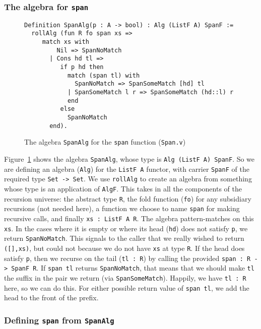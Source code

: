 \documentclass[a4paper,USenglish]{lipics-v2021}
\begin{document}
\subsubsection{The algebra for \texttt{span}}


\begin{figure}
\begin{verbatim}
Definition SpanAlg(p : A -> bool) : Alg (ListF A) SpanF :=
  rollAlg (fun R fo span xs => 
     match xs with
         Nil => SpanNoMatch 
       | Cons hd tl =>
          if p hd then
            match (span tl) with
              SpanNoMatch => SpanSomeMatch [hd] tl
            | SpanSomeMatch l r => SpanSomeMatch (hd::l) r
            end
          else
            SpanNoMatch 
       end).
\end{verbatim}
\caption{The algebra \texttt{SpanAlg} for the \texttt{span} function (\texttt{Span.v})}
\label{fig:spanalg}
\end{figure}

Figure~\ref{fig:spanalg} shows the algebra
\verb|SpanAlg|, whose type is \verb|Alg (ListF A) SpanF|.  So we are defining
an algebra (\verb|Alg|) for the \verb|ListF A| functor, with carrier
\verb|SpanF| of the required type \verb|Set -> Set|.  We use
\verb|rollAlg| to create an algebra from something whose type is an
application of \verb|AlgF|.  This takes in all the components of the
recursion universe: the abstract type \verb|R|, the fold function
(\verb|fo|) for any subsidiary recursions (not needed here), a
function we choose to name \verb|span| for making recursive calls, and
finally \verb|xs : ListF A R|.  The algebra pattern-matches on this
\verb|xs|.  In the cases where it is empty or where its head
(\verb|hd|) does not satisfy \verb|p|, we return \verb|SpanNoMatch|.
This signals to the caller that we really wished to return
\verb|([],xs)|, but could not because we do not have \verb|xs| at type
\verb|R|.  If the head does satisfy \verb|p|, then we recurse on the
tail (\verb|tl : R|) by calling the provided
\verb|span : R -> SpanF R|.  If \verb|span tl| returns
\verb|SpanNoMatch|, that means that we should make \verb|tl| the
suffix in the pair we return (via \verb|SpanSomeMatch|).  Happily, we
have \verb|tl : R| here, so we can do this.  For either possible return
value of \verb|span tl|, we add the head to the front of the
prefix.

\subsubsection{Defining \texttt{span} from \texttt{SpanAlg}}
\end{document}
